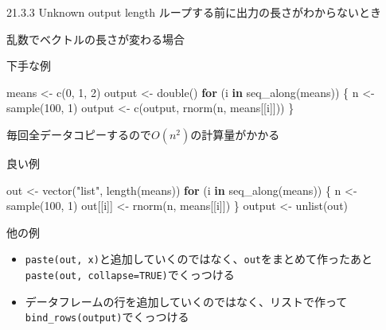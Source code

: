 \documentclass[
  ignorenonframetext,
  aspectratio=169]{beamer}
\newenvironment{Shaded}{\begin{snugshade}}{\end{snugshade}}
\newcommand{\ControlFlowTok}[1]{\textcolor[rgb]{0.13,0.29,0.53}{\textbf{#1}}}
\newcommand{\DecValTok}[1]{\textcolor[rgb]{0.00,0.00,0.81}{#1}}
\newcommand{\FunctionTok}[1]{\textcolor[rgb]{0.00,0.00,0.00}{#1}}
\newcommand{\NormalTok}[1]{#1}
\newcommand{\OtherTok}[1]{\textcolor[rgb]{0.56,0.35,0.01}{#1}}
\newcommand{\StringTok}[1]{\textcolor[rgb]{0.31,0.60,0.02}{#1}}
\providecommand{\tightlist}{%
  \setlength{\itemsep}{0pt}\setlength{\parskip}{0pt}}
\begin{document}
\begin{frame}{21.3.3 Unknown output length}
\protect\hypertarget{unknown-output-length}{}
ループする前に出力の長さがわからないとき
\end{frame}

\begin{frame}[fragile]{乱数でベクトルの長さが変わる場合}
\protect\hypertarget{ux4e71ux6570ux3067ux30d9ux30afux30c8ux30ebux306eux9577ux3055ux304cux5909ux308fux308bux5834ux5408}{}
\begin{block}{下手な例}
\protect\hypertarget{ux4e0bux624bux306aux4f8b}{}
\begin{Shaded}
\begin{Highlighting}[]
\NormalTok{means }\OtherTok{\textless{}{-}} \FunctionTok{c}\NormalTok{(}\DecValTok{0}\NormalTok{, }\DecValTok{1}\NormalTok{, }\DecValTok{2}\NormalTok{)}
\NormalTok{output }\OtherTok{\textless{}{-}} \FunctionTok{double}\NormalTok{()}
\ControlFlowTok{for}\NormalTok{ (i }\ControlFlowTok{in} \FunctionTok{seq\_along}\NormalTok{(means)) \{}
\NormalTok{  n }\OtherTok{\textless{}{-}} \FunctionTok{sample}\NormalTok{(}\DecValTok{100}\NormalTok{, }\DecValTok{1}\NormalTok{)}
\NormalTok{  output }\OtherTok{\textless{}{-}} \FunctionTok{c}\NormalTok{(output, }\FunctionTok{rnorm}\NormalTok{(n, means[[i]]))}
\NormalTok{\}}
\end{Highlighting}
\end{Shaded}

毎回全データコピーするので\(O(n^2)\)の計算量がかかる
\end{block}
\end{frame}

\begin{frame}[fragile]{良い例}
\protect\hypertarget{ux826fux3044ux4f8b}{}
\begin{Shaded}
\begin{Highlighting}[]
\NormalTok{out }\OtherTok{\textless{}{-}} \FunctionTok{vector}\NormalTok{(}\StringTok{"list"}\NormalTok{, }\FunctionTok{length}\NormalTok{(means))}
\ControlFlowTok{for}\NormalTok{ (i }\ControlFlowTok{in} \FunctionTok{seq\_along}\NormalTok{(means)) \{}
\NormalTok{  n }\OtherTok{\textless{}{-}} \FunctionTok{sample}\NormalTok{(}\DecValTok{100}\NormalTok{, }\DecValTok{1}\NormalTok{)}
\NormalTok{  out[[i]] }\OtherTok{\textless{}{-}} \FunctionTok{rnorm}\NormalTok{(n, means[[i]])}
\NormalTok{\}}
\NormalTok{output }\OtherTok{\textless{}{-}} \FunctionTok{unlist}\NormalTok{(out)}
\end{Highlighting}
\end{Shaded}

\begin{block}{他の例}
\protect\hypertarget{ux4ed6ux306eux4f8b}{}
\begin{itemize}
\tightlist
\item
  \texttt{paste(out,\ x)}と追加していくのではなく、\texttt{out}をまとめて作ったあと\texttt{paste(out,\ collapse=TRUE)}でくっつける
\item
  データフレームの行を追加していくのではなく、リストで作って\texttt{bind\_rows(output)}でくっつける
\end{itemize}
\end{block}
\end{frame}
\end{document}
